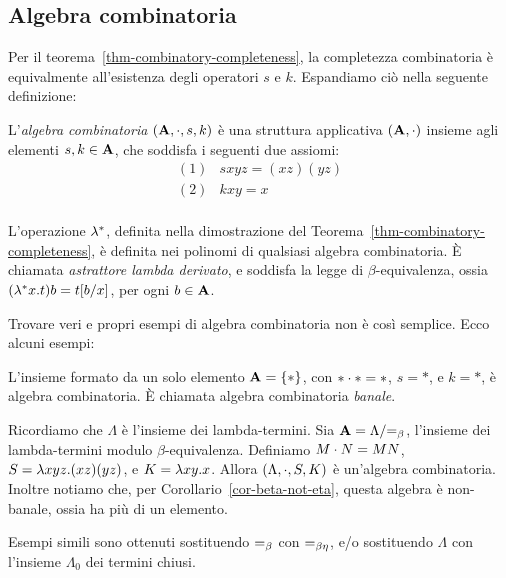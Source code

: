 \documentclass{article}
\begin{document}
\subsection{Algebra combinatoria}\label{ssec-comb-alg}

Per il teorema~\ref{thm-combinatory-completeness}, la completezza
combinatoria \`e equivalmente all'esistenza degli operatori $s$ e $k$.
Espandiamo ci\`o nella seguente definizione:

\begin{definition}
  L'{\em algebra combinatoria} $({\bf A},\cdot,s,k)$ \`e una struttura
  applicativa $({\bf A},\cdot)$ insieme agli elementi $s,k\in{\bf A}$,
  che soddisfa i seguenti due assiomi:
    \[ \begin{array}{ll}
    (1) & sxyz = (xz)(yz) \\
    (2) & kxy = x \\
  \end{array}
  \]
\end{definition}

\begin{remark}\label{rem-derived-lambda}
  L'operazione $\lambda^*$, definita nella dimostrazione del
  Teorema~\ref{thm-combinatory-completeness}, \`e definita nei
  polinomi di qualsiasi algebra combinatoria. \`E chiamata {\em astrattore
    lambda derivato}, e soddisfa la legge di $\beta$-equivalenza,
  ossia $(\lambda^*x.t)b = t[b/x]$, per ogni $b\in{\bf A}$.
\end{remark}

Trovare veri e propri esempi di algebra combinatoria non \`e cos\`i semplice.
Ecco alcuni esempi:

\begin{example}
  L'insieme formato da un solo elemento ${\bf A}=\{*\}$, con $*\cdot *=*$, $s=*$, e $k=*$,
  \`e algebra combinatoria. \`E chiamata algebra combinatoria {\em banale}. 
\end{example}

\begin{example}
  Ricordiamo che $\Lambda$ \`e l'insieme dei lambda-termini. Sia
  ${\bf A}=\Lambda/{=_{\beta}}$, l'insieme dei lambda-termini modulo
  $\beta$-equivalenza. Definiamo $M\cdot N=MN$, $S=\lambda xyz.(xz)(yz)$,
  e $K=\lambda xy.x$. Allora $(\Lambda,\cdot,S,K)$ \`e un'algebra combinatoria.
  Inoltre notiamo che, per Corollario~\ref{cor-beta-not-eta}, questa
  algebra  \`e non-banale, ossia ha pi\`u di un elemento.
  
  Esempi simili sono ottenuti sostituendo $=_{\beta}$ con $=_{\beta\eta}$, e/o
  sostituendo $\Lambda$ con l'insieme $\Lambda_0$ dei termini chiusi.
\end{example}
\end{document}
